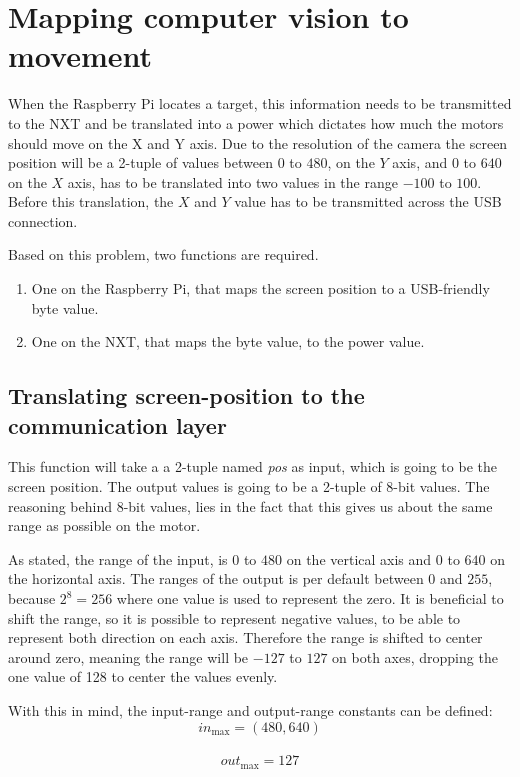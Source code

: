 \section{Mapping computer vision to movement}\label{sec:mappingcompvis}
When the Raspberry Pi locates a target, this information needs to be transmitted to the NXT and be translated into a power which dictates how much the motors should move on the X and Y axis.
Due to the resolution of the camera the screen position will be a 2-tuple of values between $0$ to $480$, on the $Y$ axis, and $0$ to $640$ on the $X$ axis, has to be translated into two values in the range $-100$ to $100$.
Before this translation, the $X$ and $Y$ value has to be transmitted across the USB connection.

Based on this problem, two functions are required.
\begin{enumerate}
	\item One on the Raspberry Pi, that maps the screen position to a USB-friendly byte value.
	\item One on the NXT, that maps the byte value, to the power value.
\end{enumerate}


\subsection{Translating screen-position to the communication layer}
This function will take a a 2-tuple named \textit{pos} as input, which is going to be the screen position.
The output values is going to be a 2-tuple of 8-bit values.
The reasoning behind 8-bit values, lies in the fact that this gives us about the same range as possible on the motor.

As stated, the range of the input, is $0$ to $480$ on the vertical axis and $0$ to $640$ on the horizontal axis.
The ranges of the output is per default between $0$ and $255$, because $2^8 = 256 $ where one value is used to represent the zero.
It is beneficial to shift the range, so it is possible to represent negative values, to be able to represent both direction on each axis.
Therefore the range is shifted to center around zero, meaning the range will be $-127$ to $127$ on both axes, dropping the one value of 128 to center the values evenly.

With this in mind, the input-range and output-range constants can be defined:\\
$$in_\text{max} = (480,640)$$\\
$$out_\text{max} = 127$$

